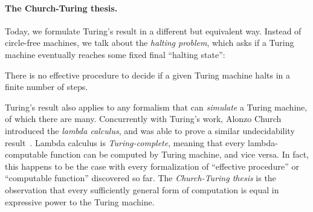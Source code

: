\documentclass[../generics]{subfiles}
\begin{document}
\paragraph{The Church-Turing thesis.}
Today, we formulate Turing's result in a different but equivalent way. Instead of circle-free machines, we talk about the \emph{halting problem}, which asks if a Turing machine eventually reaches some fixed final ``halting state'':
\begin{theorem}\label{turing thm}
There is no effective procedure to decide if a given Turing machine halts in a finite number of steps.
\end{theorem}
Turing's result also applies to any formalism that can \emph{simulate} a Turing machine, of which there are many. Concurrently with Turing's work, Alonzo Church introduced the \emph{lambda calculus}, and was able to prove a similar undecidability result~\cite{church}. Lambda calculus is \emph{Turing-complete}, meaning that every lambda-computable function can be computed by Turing machine, and vice versa. In fact, this happens to be the case with every formalization of ``effective procedure'' or ``computable function'' discovered so far. The \emph{Church-Turing thesis} is the observation that every sufficiently general form of computation is equal in expressive power to the Turing machine.
\end{document}
